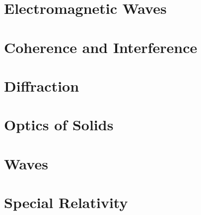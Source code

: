 \documentclass{book}
\begin{document}
\chapter{Electromagnetic Waves}

%
\chapter{Coherence and Interference}

\chapter{Diffraction}

\chapter{Optics of Solids}

\begin{comment}
\part{Relativistic Electrodynamics}
\end{comment}
\appendix
\begin{comment}
\chapter{Electric Circuits}
\section{Electronics}
\section{DC Current}
\section{AC Current}
\chapter{Magnetic Circuits}
\end{comment}
\chapter{Waves}

\chapter{Special Relativity}

\nocite{griffem,jackson,landau2,zangwillem,fowles,fourieropt}
\printbibliography
\end{document}

